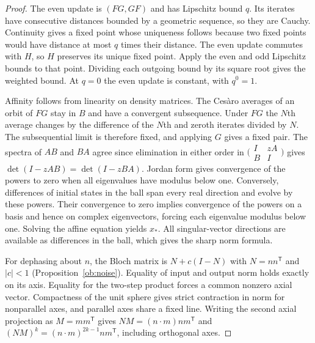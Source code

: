 \documentclass[aps,pra,onecolumn,superscriptaddress,nofootinbib,10pt]{revtex4-2}
\theoremstyle{definition}
\theoremstyle{remark}
\begin{document}
\begin{proof}
The even update is $(FG,GF)$ and has Lipschitz bound $q$. Its iterates
have consecutive distances bounded by a geometric sequence, so they
are Cauchy. Continuity gives a fixed point whose uniqueness follows
because two fixed points would have distance at most $q$ times their
distance. The even update commutes with $H$, so $H$ preserves its
unique fixed point. Apply the even and odd Lipschitz bounds to that
point. Dividing each outgoing bound by its square root gives the
weighted bound. At $q=0$ the even update is constant, with $q^0=1$.

Affinity follows from linearity on density matrices. The Ces\`aro
averages of an orbit of $FG$ stay in $B$ and have a convergent
subsequence. Under $FG$ the $N$th average changes by the difference of
the $N$th and zeroth iterates divided by $N$. The subsequential limit
is therefore fixed, and applying $G$ gives a fixed pair.
The spectra of $AB$ and $BA$ agree since elimination in either order
in $\bigl(\begin{smallmatrix}I&zA\\B&I\end{smallmatrix}\bigr)$ gives
$\det(I-zAB)=\det(I-zBA)$. Jordan form gives convergence of the
powers to zero when all eigenvalues have modulus below one. Conversely,
differences of initial states in the ball span every real direction
and evolve by these powers. Their convergence to zero implies convergence
of the powers on a basis and hence on complex eigenvectors, forcing
each eigenvalue modulus below one. Solving the affine equation yields
$x_*$. All singular-vector directions are available as differences
in the ball, which gives the sharp norm formula.

For dephasing about $n$, the Bloch matrix is $N+c(I-N)$ with
$N=nn^{\mathsf T}$ and $|c|<1$ (Proposition~\ref{ob:noise}).
Equality of input and output norm holds exactly on its axis.
Equality for the two-step product forces a common nonzero axial
vector. Compactness of the unit sphere gives strict contraction in
norm for nonparallel axes, and parallel axes share a fixed line.
Writing the second axial projection as $M=mm^{\mathsf T}$ gives
$NM=(n\cdot m)nm^{\mathsf T}$ and
$(NM)^k=(n\cdot m)^{2k-1}nm^{\mathsf T}$, including orthogonal axes.
\end{proof}
\end{document}
